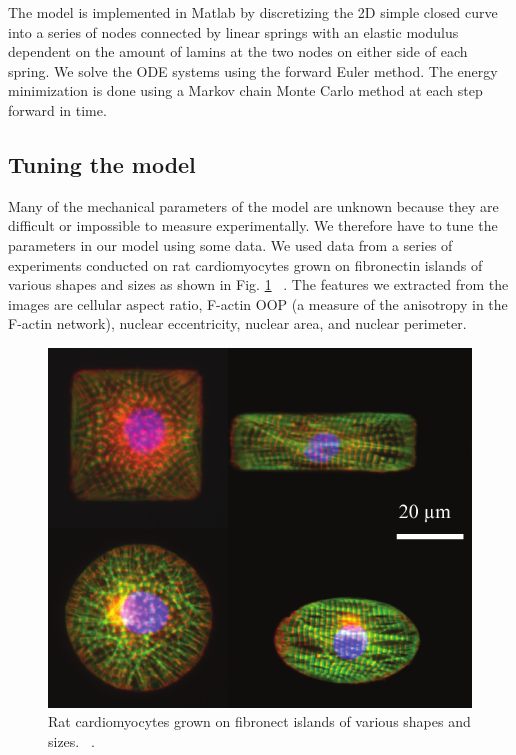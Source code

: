 The model is implemented in Matlab by discretizing the 2D simple closed curve into a series of nodes connected by linear springs with an elastic modulus dependent on the amount of lamins at the two nodes on either side of each spring. We solve the ODE systems using the forward Euler method. The energy minimization is done using a Markov chain Monte Carlo method at each step forward in time. 

\subsection{Tuning the model}

Many of the mechanical parameters of the model are unknown because they are difficult or impossible to measure experimentally. We therefore have to tune the parameters in our model using some data. We used data from a series of experiments conducted on rat cardiomyocytes grown on fibronectin islands of various shapes and sizes as shown in Fig. \ref{fig::nancycells} ~\cite{Drew2016}. The features we extracted from the images are cellular aspect ratio, F-actin OOP (a measure of the anisotropy in the F-actin network), nuclear eccentricity, nuclear area, and nuclear perimeter. 

\begin{figure}[h]
\centering
\captionsetup{width=.9\linewidth}
\includegraphics[width=4.5in]{Project3/figs/nancycells.pdf}
\caption{Rat cardiomyocytes grown on fibronect islands of various shapes and sizes. ~\cite{Drew2016}.}
\label{fig::nancycells}
\end{figure}

